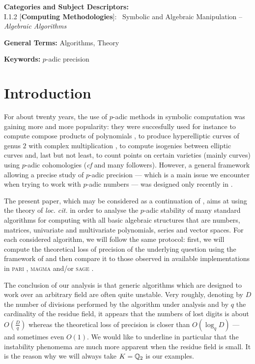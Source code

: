 \documentclass{sig-alternate}
\begin{document}
\vspace{1mm}
 \noindent
 {\bf Categories and Subject Descriptors:} \\
\noindent I.1.2 [{\bf Computing Methodologies}]:{~} Symbolic and Algebraic
  Manipulation -- \emph{Algebraic Algorithms}

 \vspace{1mm}
 \noindent
 {\bf General Terms:} Algorithms, Theory

 \vspace{1mm}
 \noindent
 {\bf Keywords:} $p$-adic precision
\medskip

\section{Introduction}

For about twenty years, the use of $p$-adic methods in symbolic 
computation was gaining more and more popularity: they were succesfully 
used for instance 
to compute compose products of polynomials 
\cite{boston-gonzalez-perdry-schost:05a}, 
to produce hyperelliptic curves of genus $2$ with complex multiplication 
\cite{gaudry-houtmann-weng-ritzenthaler-kohel:06a},
to compute isogenies between elliptic curves \cite{lercier-sirvent:08a} 
and, last but not least,
to count points on certain varieties (mainly curves) using $p$-adic 
cohomologies (\emph{cf} \cite{kedlaya:01a,lauder:04a} and many
followers).
However, a general framework allowing a precise study of $p$-adic 
precision --- which is a main issue we encounter when trying to work 
with $p$-adic numbers --- was designed only recently in 
\cite{caruso-roe-vaccon:14a}. 

The present paper, which may be considered as a continuation of 
\cite{caruso-roe-vaccon:14a}, aims at using the theory of \emph{loc. cit.} in 
order to analyse the $p$-adic stability of many standard algorithms
for computing with all basic algebraic structures that are numbers,
matrices, univariate and multivariate polynomials, series and vector
spaces. For each considered algorithm, we will follow the same protocol: 
first, we will compute the theoretical loss of precision of the 
underlying question using the framework of \cite{caruso-roe-vaccon:14a} and then 
compare it to those observed in available implementations in 
\textsc{pari} \cite{pari}, \textsc{magma} \cite{magma} and/or 
\textsc{sage} \cite{sage}. 

The conclusion of our analysis is that generic algorithms which are 
designed to work over an arbitrary field are often quite unstable. Very 
roughly, denoting by $D$ the number of divisions performed by the 
algorithm under analysis and by $q$ the cardinality of the residue 
field, it appears that the numbers of lost digits is about $O(\frac D 
q)$ whereas the theoretical loss of precision is closer than $O(\log_q 
D)$ --- and sometimes even $O(1)$. We would like to underline in 
particular that the instability phenomema are much more apparent when 
the residue field is small. It is the reason why we will always take
$K = \mathbb Q_2$ is our examples.
\end{document}
